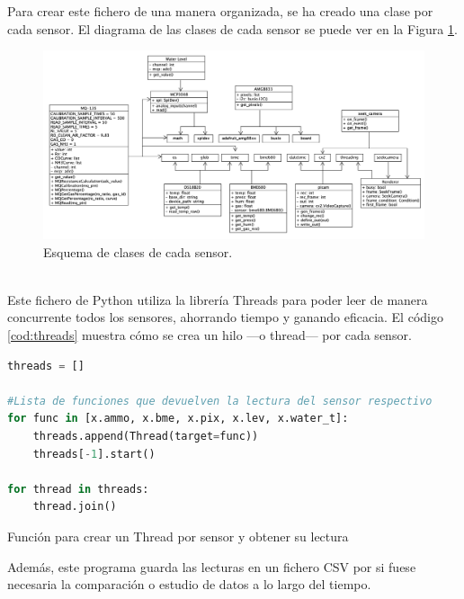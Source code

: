 Para crear este fichero de una manera organizada, se ha creado una clase por cada sensor. El diagrama de las clases de cada sensor se puede ver en la Figura \ref{fig:umlet}. 
\begin{figure} [h!]
  \begin{center}
    \includegraphics[width=16cm]{figs/umlet}
  \end{center}
  \caption{Esquema de clases de cada sensor.}
  \label{fig:umlet}
\end{figure}\\

Este fichero de Python utiliza la librería Threads para poder leer de manera concurrente todos los sensores, ahorrando tiempo y ganando eficacia. El código \ref{cod:threads} muestra cómo se crea un hilo ---o thread--- por cada sensor.
\begin{code}[h]
\begin{lstlisting}[language=Python]
threads = []

#Lista de funciones que devuelven la lectura del sensor respectivo
for func in [x.ammo, x.bme, x.pix, x.lev, x.water_t]: 
	threads.append(Thread(target=func))
	threads[-1].start()
	
for thread in threads:
	thread.join()
\end{lstlisting}
\caption[Función para crear un Thread por sensor y obtener su lectura]{Función para crear un Thread por sensor y obtener su lectura}
\label{cod:threads}
\end{code}

Además, este programa guarda las lecturas en un fichero CSV por si fuese necesaria la comparación o estudio de datos a lo largo del tiempo. 


